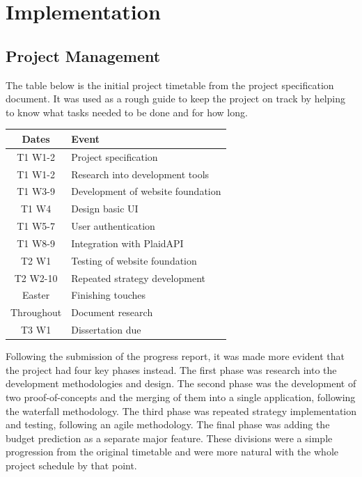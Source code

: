 \chapter{Implementation}
\label{ch:implementation}

\section{Project Management}
The table below is the initial project timetable from the project specification document. It was used as a rough guide to keep the project on track by helping to know what tasks needed to be done and for how long.

\begin{center}
	\begin{tabular}{ | c | l | }
		\hline
		\textbf{Dates} & \textbf{Event}                    \\ \hline
		T1 W1-2        & Project specification             \\ \hline
		T1 W1-2        & Research into development tools   \\ \hline
		T1 W3-9        & Development of website foundation \\ \hline
		T1 W4          & Design basic UI                   \\ \hline
		T1 W5-7        & User authentication               \\ \hline
		T1 W8-9        & Integration with PlaidAPI         \\ \hline
		T2 W1          & Testing of website foundation     \\ \hline
		T2 W2-10       & Repeated strategy development     \\ \hline
		Easter         & Finishing touches                 \\ \hline
		Throughout     & Document research                 \\ \hline
		T3 W1          & Dissertation due                  \\ \hline
	\end{tabular}
\end{center}

Following the submission of the progress report, it was made more evident that the project had four key phases instead. The first phase was research into the development methodologies and design. The second phase was the development of two proof-of-concepts and the merging of them into a single application, following the waterfall methodology. The third phase was repeated strategy implementation and testing, following an agile methodology. The final phase was adding the budget prediction as a separate major feature. These divisions were a simple progression from the original timetable and were more natural with the whole project schedule by that point.

